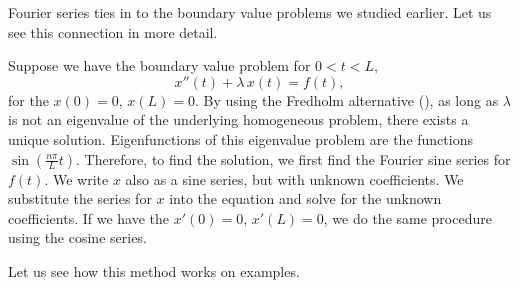 \documentclass[12pt]{book}
\begin{document}
Fourier series ties in to the boundary value problems
we studied earlier.  Let us see this connection in more detail.

Suppose we have the boundary value problem for $0 < t < L$,
\begin{equation*}
x''(t) + \lambda\, x(t) = f(t) ,
\end{equation*}
for the \emph{}
$x(0) = 0$, $x(L) = 0$.
By using the Fredholm alternative (),
as long as $\lambda$ is not an eigenvalue of the underlying homogeneous
problem, there exists a unique solution.
Eigenfunctions of this eigenvalue problem are the functions
$\sin \left( \frac{n \pi}{L} t \right)$.
Therefore,
to find the solution,
we first find the Fourier sine series for $f(t)$.
We write $x$ also as a sine series, but with unknown coefficients.  
We substitute the series for $x$ into the equation and solve for the unknown
coefficients.
If we have
the \emph{}
$x'(0) = 0$, $x'(L) = 0$, we do the same procedure using the cosine
series.

Let us see how this method works on examples.
\end{document}
